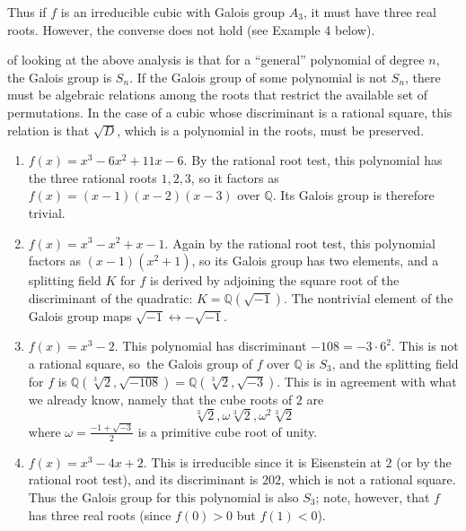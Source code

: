 \documentclass[12pt]{article}
\newcommand{\Rats}{\mathbb{Q}}
\begin{document}
Thus if $f$ is an irreducible cubic with Galois group $A_3$, it must have three real roots. However, the converse does not hold (see Example 4 below).

 of looking at the above analysis is that for a ``general'' polynomial of degree $n$, the Galois group is $S_n$. If the Galois group of some polynomial is not $S_n$, there must be algebraic relations among the roots that restrict the available set of permutations. In the case of a cubic whose discriminant is a rational square, this relation is that $\sqrt{D}$, which is a polynomial in the roots, must be preserved.

\begin{enumerate}
\renewcommand{\labelenumi}{Example \arabic{enumi}}

\item $f(x)=x^3-6x^2+11x-6$. By the rational root test, this polynomial has the three rational roots $1,2,3$, so it factors as $f(x)=(x-1)(x-2)(x-3)$ over $\Rats$. Its Galois group is therefore trivial.

\item $f(x)=x^3-x^2+x-1$. Again by the rational root test, this polynomial factors as $(x-1)(x^2+1)$, so its Galois group has two elements, and a splitting field $K$ for $f$ is derived by adjoining the square root of the discriminant of the quadratic: $K=\Rats(\sqrt{-1})$. The nontrivial element of the Galois group maps $\sqrt{-1}\leftrightarrow -\sqrt{-1}$.

\item $f(x)=x^3-2$. This polynomial has discriminant $-108=-3\cdot 6^2$. This is not a rational square, so\ the Galois group of $f$ over $\Rats$ is $S_3$, and the splitting field for $f$ is $\Rats(\sqrt[3]{2},\sqrt{-108})=\Rats(\sqrt[3]{2},\sqrt{-3})$. This is in agreement with what we already know, namely that the cube roots of $2$ are
\[\sqrt[3]{2}, \omega\sqrt[3]{2}, \omega^2\sqrt[3]{2}\]
where $\omega=\frac{-1+\sqrt{-3}}{2}$ is a primitive cube root of unity.

\item $f(x)=x^3-4x+2$. This is irreducible since it is Eisenstein at $2$ (or by the rational root test), and its discriminant is $202$, which is not a rational square. Thus the Galois group for this polynomial is also $S_3$; note, however, that $f$ has three real roots (since $f(0)>0$ but $f(1)<0$).


\end{enumerate}
\end{document}
